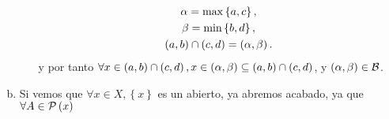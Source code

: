 \begin{eje}
\begin{enumerate}[(a)]
\begin{enumerate}[i)]
                    \begin{gather*}
                        \alpha = \max \left\{ a, c \right\}, \\
                        \beta = \min \left\{ b, d \right\}, \\
                        \left( a, b \right) \cap \left( c, d \right) = \left( \alpha, \beta \right).
                    \end{gather*}
                    y por tanto $\forall x \in \left( a, b \right) \cap \left( c, d \right), x \in \left( \alpha, \beta \right) \subseteq \left( a, b \right) \cap \left( c, d \right)$, y $\left( \alpha, \beta \right) \in \mathcal{B}$.
            \end{enumerate}
        \item Si vemos que $\forall x \in X, \left\{ x \right\}$ es un abierto, ya abremos acabado, ya que $\forall A \in \mathcal{P} \left( x \right)$
    \end{enumerate}
\end{eje}
